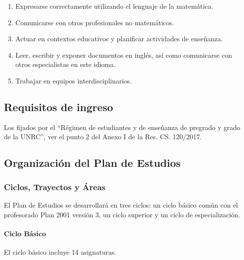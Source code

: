 \documentclass[a4paper, 12pt]{article}
\begin{document}
\begin{enumerate}
\item {Expresarse correctamente
utilizando el lenguaje de la
matemática.} 
 


\item {Comunicarse
con otros profesionales no matemáticos}. 

 

\item {Actuar en contextos educativos y planificar actividades de enseñanza}. 
 


\item {Leer, escribir y exponer documentos en
inglés, así como comunicarse con otros
especialistas en este idioma}. 

 


\item {Trabajar en equipos
interdisciplinarios.} 

\end{enumerate}


\subsection{Requisitos de ingreso}



Los fijados por el ``Régimen  de estudiantes y de enseñanza de pregrado y grado de la UNRC'', ver  el punto 2 del Anexo I de la Res. CS. 120/2017. 



\subsection{Organización del Plan de Estudios}

\subsubsection{Ciclos, Trayectos  y Áreas} El Plan de Estudios se desarrollará en tres ciclos:
un ciclo básico común con el profesorado Plan 2001 versión 3, un ciclo superior y un
ciclo de especialización.

\paragraph{Ciclo Básico} El ciclo básico incluye 14 asignaturas.
\end{document}
